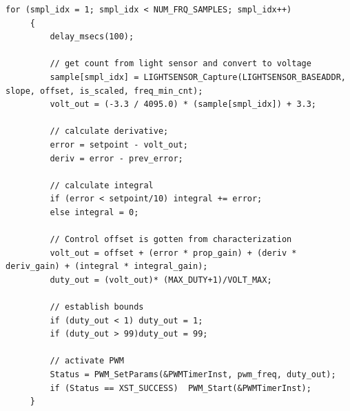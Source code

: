 \documentclass[11pt]{article}
\begin{document}
 \begin{lstlisting}[caption=PID Algorithm, label=PID]		
     for (smpl_idx = 1; smpl_idx < NUM_FRQ_SAMPLES; smpl_idx++)
     {
         delay_msecs(100);
 
         // get count from light sensor and convert to voltage 
         sample[smpl_idx] = LIGHTSENSOR_Capture(LIGHTSENSOR_BASEADDR, slope, offset, is_scaled, freq_min_cnt);
         volt_out = (-3.3 / 4095.0) * (sample[smpl_idx]) + 3.3;

         // calculate derivative;
         error = setpoint - volt_out;
         deriv = error - prev_error;
 
         // calculate integral
         if (error < setpoint/10) integral += error;
         else integral = 0; 
 
         // Control offset is gotten from characterization
         volt_out = offset + (error * prop_gain) + (deriv * deriv_gain) + (integral * integral_gain);
         duty_out = (volt_out)* (MAX_DUTY+1)/VOLT_MAX;
 
         // establish bounds
         if (duty_out < 1) duty_out = 1;
         if (duty_out > 99)duty_out = 99;
 
         // activate PWM
         Status = PWM_SetParams(&PWMTimerInst, pwm_freq, duty_out);
         if (Status == XST_SUCCESS)	 PWM_Start(&PWMTimerInst);
     } 
  \end{lstlisting}
  
  
\end{document}
